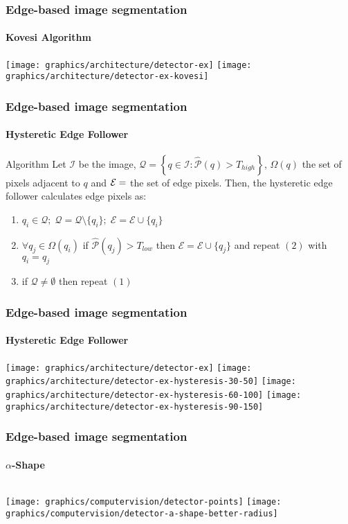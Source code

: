 \begin{frame}
	\frametitle{Edge-based image segmentation}
	\framesubtitle{Kovesi Algorithm}
	 {
		\texttt{[image: graphics/architecture/detector-ex]}
	}
	\onslide<2> {
		\texttt{[image: graphics/architecture/detector-ex-kovesi]}
	}
\end{frame}

\begin{frame}
	\frametitle{Edge-based image segmentation}
	\framesubtitle{Hysteretic Edge Follower}
	\begin{block}{Algorithm}
	  	Let $\mathcal{I}$ be the image, $\mathcal{Q} = \left\{q \in \mathcal{I} \colon \hat{\mathcal{P}}(q) > T_{high}\right\}$, $\Omega(q)$ the set of  pixels adjacent to $q$ and $\mathcal{E} = \empty$ the set of edge pixels.
		Then, the hysteretic edge follower calculates edge pixels as:
		\begin{enumerate}
			\item $q_i \in \mathcal{Q};\; \mathcal{Q} = \mathcal{Q} \setminus \{q_i\};\;\mathcal{E} = \mathcal{E} \cup \{q_i\}$
			\item $\forall q_j \in \Omega(q_i)$ if $\hat{\mathcal{P}}(q_j) > T_{low}$ then $\mathcal{E} = \mathcal{E} \cup \{q_j\}$ and repeat $(2)$ with $q_i = q_j$
			\item if $\mathcal{Q} \neq \emptyset$ then repeat $(1)$
		\end{enumerate}
	\end{block}
\end{frame}

\begin{frame}
	\frametitle{Edge-based image segmentation}
	\framesubtitle{Hysteretic Edge Follower}
	 {
		\texttt{[image: graphics/architecture/detector-ex]}
	}
	\only<2-4> {
		\texttt{[image: graphics/architecture/detector-ex-hysteresis-30-50]}
	}
	\only<3-4> {
		\texttt{[image: graphics/architecture/detector-ex-hysteresis-60-100]}
	}
	\only<4-4> {
		\texttt{[image: graphics/architecture/detector-ex-hysteresis-90-150]}
	}
\end{frame}

\begin{frame}
    \frametitle{Edge-based image segmentation}
    \framesubtitle{$\alpha$-Shape}
    \begin{columns}[onlytextwidth]
             {
                \texttt{[image: graphics/computervision/detector-points]}
            }
             {
                \texttt{[image: graphics/computervision/detector-a-shape-better-radius]}
            }
    \end{columns}
\end{frame}

